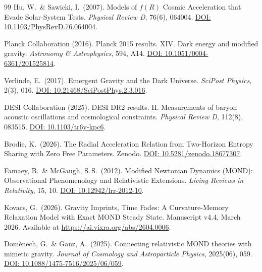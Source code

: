 \documentclass[aps,prd,twocolumn,superscriptaddress,nofootinbib]{revtex4-2}
\begin{document}
\begin{thebibliography}{99}
Hu, W.\ \& Sawicki, I.\ (2007).
Models of $f(R)$ Cosmic Acceleration that Evade Solar-System Tests.
\textit{Physical Review D}, 76(6), 064004.
\href{https://doi.org/10.1103/PhysRevD.76.064004}{DOI: 10.1103/PhysRevD.76.064004}.

Planck Collaboration (2016).
Planck 2015 results. XIV. Dark energy and modified gravity.
\textit{Astronomy \& Astrophysics}, 594, A14.
\href{https://doi.org/10.1051/0004-6361/201525814}{DOI: 10.1051/0004-6361/201525814}.

Verlinde, E.\ (2017).
Emergent Gravity and the Dark Universe.
\textit{SciPost Physics}, 2(3), 016.
\href{https://doi.org/10.21468/SciPostPhys.2.3.016}{DOI: 10.21468/SciPostPhys.2.3.016}.

DESI Collaboration (2025).
DESI DR2 results. II. Measurements of baryon acoustic oscillations and cosmological constraints.
\textit{Physical Review D}, 112(8), 083515.
\href{https://doi.org/10.1103/tr6y-kpc6}{DOI: 10.1103/tr6y-kpc6}.

Brodie, K.\ (2026).
The Radial Acceleration Relation from Two-Horizon Entropy Sharing with Zero Free Parameters.
Zenodo. \href{https://doi.org/10.5281/zenodo.18677307}{DOI: 10.5281/zenodo.18677307}.

Famaey, B.\ \& McGaugh, S.\,S.\ (2012).
Modified Newtonian Dynamics (MOND): Observational Phenomenology and Relativistic Extensions.
\textit{Living Reviews in Relativity}, 15, 10.
\href{https://doi.org/10.12942/lrr-2012-10}{DOI: 10.12942/lrr-2012-10}.

Kovacs, G.\ (2026).
Gravity Imprints, Time Fades: A Curvature-Memory Relaxation Model with Exact MOND Steady State.
Manuscript v4.4, March 2026.
Available at \url{https://ai.vixra.org/abs/2604.0006}.

Dom\`enech, G.\ \& Ganz, A.\ (2025).
Connecting relativistic MOND theories with mimetic gravity.
\textit{Journal of Cosmology and Astroparticle Physics}, 2025(06), 059.
\href{https://doi.org/10.1088/1475-7516/2025/06/059}{DOI: 10.1088/1475-7516/2025/06/059}.

\end{thebibliography}
\end{document}
